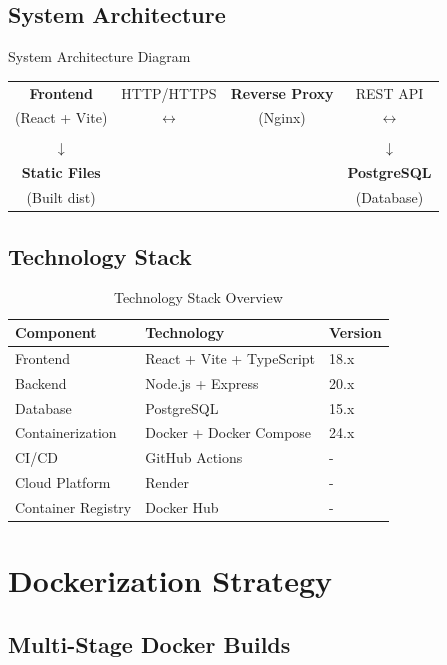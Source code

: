 \documentclass[12pt]{article}
\begin{document}
\subsection{System Architecture}

\begin{infobox}{System Architecture Diagram}
\begin{center}
\begin{tabular}{cccc}
\textbf{Frontend} & HTTP/HTTPS & \textbf{Reverse Proxy} & REST API \\
(React + Vite) & $\leftrightarrow$ & (Nginx) & $\leftrightarrow$ \\
& & & \\
$\downarrow$ & & & $\downarrow$ \\
\textbf{Static Files} & & & \textbf{PostgreSQL} \\
(Built dist) & & & (Database) \\
\end{tabular}
\end{center}
\end{infobox}

\subsection{Technology Stack}
\begin{table}[ht!]
\centering
\begin{tabular}{|l|l|l|}
\hline
\rowcolor{lightblue}
\textbf{Component} & \textbf{Technology} & \textbf{Version} \\
\hline
Frontend & React + Vite + TypeScript & 18.x \\
Backend & Node.js + Express & 20.x \\
Database & PostgreSQL & 15.x \\
Containerization & Docker + Docker Compose & 24.x \\
CI/CD & GitHub Actions & - \\
Cloud Platform & Render & - \\
Container Registry & Docker Hub & - \\
\hline
\end{tabular}
\caption{Technology Stack Overview}
\end{table}

\section{Dockerization Strategy}

\subsection{Multi-Stage Docker Builds}
\end{document}
